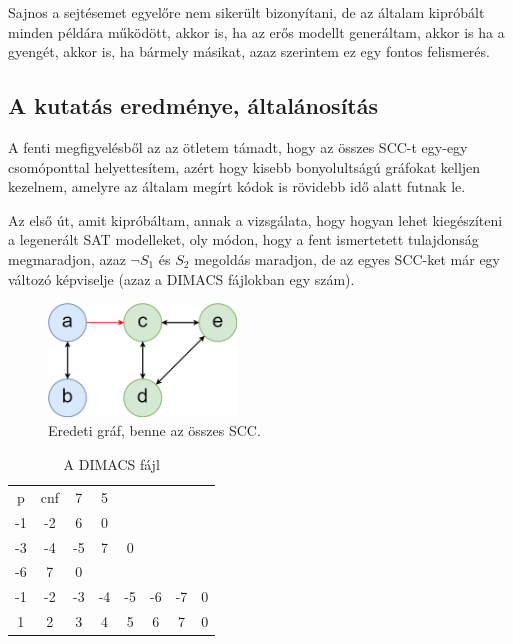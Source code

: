 \documentclass[
]{thesis-ekf}
\theoremstyle{definition}
\theoremstyle{remark}
\begin{document}
	Sajnos a sejtésemet egyelőre nem sikerült bizonyítani, de az általam kipróbált minden példára működött, akkor is, ha az erős modellt generáltam, akkor is ha a gyengét, akkor is, ha bármely másikat, azaz szerintem ez egy fontos felismerés.
	
		\subsection{A kutatás eredménye, általánosítás}

	A fenti megfigyelésből az az ötletem támadt, hogy az összes \textsc{SCC}-t egy-egy csomóponttal helyettesítem, azért hogy kisebb bonyolultságú gráfokat kelljen kezelnem, amelyre az általam megírt kódok is rövidebb idő alatt futnak le.

	Az első út, amit kipróbáltam, annak a vizsgálata, hogy hogyan lehet kiegészíteni a legenerált \textsc{SAT} modelleket, oly módon, hogy a fent ismertetett tulajdonság megmaradjon, azaz $\neg S_1$ és $ S_2 $ megoldás maradjon, de az egyes \textsc{SCC}-ket már egy változó képviselje (azaz a \textsc{DIMACS} fájlokban egy szám).
	\begin{figure}[ht]
		\centering
		\includegraphics[width=5cm]{images/sajat_pelda_5node_9edge}
		\caption{Eredeti gráf, benne az összes \textsc{SCC}.}
		\label{abra-sajatpelda-eredeti-5-9graf}
	\end{figure}

	\begin{table}[h!]
		\centering
		\begin{tabular}{cccccccc}
		p & cnf & 7 & 5 & & & &  \\
		-1&-2& 6& 0&  &  &  &  \\
		-3&-4&-5& 7& 0&  &  &  \\
		-6& 7& 0&  &  &  &  &  \\
		-1&-2&-3&-4&-5&-6&-7& 0 \\
		1& 2& 3& 4& 5& 6& 7& 0 \\
		\end{tabular}
		\caption{A \textsc{DIMACS} fájl}
	\end{table}
	
\end{document}
